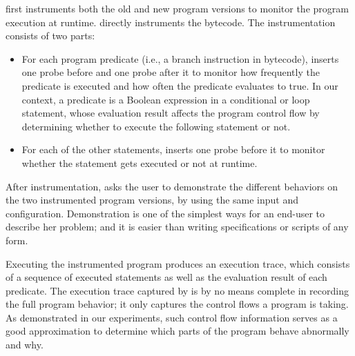 \ourtool first instruments both the old and new program versions
to monitor the program  execution at runtime. \ourtool directly
instruments the bytecode. The instrumentation
consists of two parts:

\vspace{-2mm}

\begin{itemize}
\item For each program predicate (i.e., a branch instruction
in bytecode), \ourtool inserts one
probe before and one probe after it
to monitor how frequently the predicate is executed and
how often the predicate evaluates to true. In our
context, a predicate is a Boolean expression in a
conditional or loop statement,
whose evaluation result affects the program
control flow by determining whether to execute the
following statement or not.


\item For each of the other statements, \ourtool inserts
one probe before it to monitor whether the statement
gets executed or not at runtime.



\end{itemize}


\vspace{-1mm}

After instrumentation, \ourtool asks the user to demonstrate the different
behaviors on the two instrumented program versions, by using
the same input and configuration. Demonstration is
one of the simplest ways for an end-user to describe her problem;
and it is easier than writing specifications or scripts of any form.

Executing the instrumented program produces an execution trace,
which consists of a sequence of executed statements as well
as the evaluation result of each predicate.
The execution trace captured by \ourtool is by no means complete
in recording the full program behavior; it only
captures the control flows a program is taking. As demonstrated
in our experiments, such control flow information serves as a
good approximation to determine which parts of the program behave
abnormally and why.



